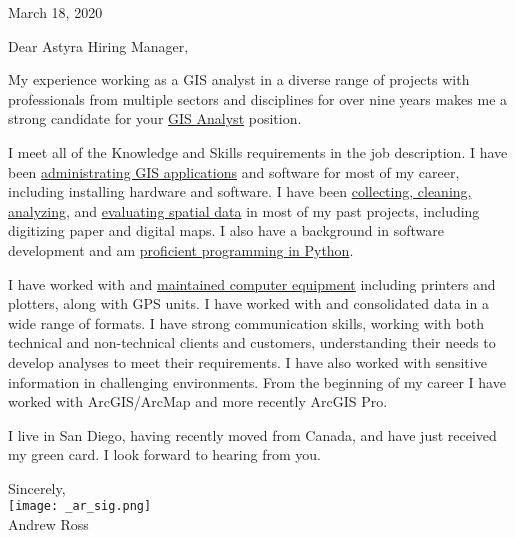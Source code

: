 \documentclass[letterpaper]{article}
\newcommand{\impt}[1]{\uline{#1}}
\begin{document}
\large

\null\hfill March 18, 2020
\vspace{1em}

Dear Astyra Hiring Manager,

My experience working as a GIS analyst in a diverse range of projects with
professionals from multiple sectors and disciplines for over nine years makes me
a strong candidate for your \impt{GIS Analyst} position.


I meet all of the Knowledge and Skills requirements in the job description.  I
have been \impt{administrating GIS applications} and software for most of my
career, including installing hardware and software.  I have been
\impt{collecting, cleaning, analyzing}, and \impt{evaluating spatial data} in
most of my past projects, including digitizing paper and digital maps.  I also
have a background in software development and am \impt{proficient programming in
Python}.

I have worked with and \impt{maintained computer equipment} including printers and
plotters, along with GPS units.  I have worked with and consolidated data in a
wide range of formats.  I have strong communication skills, working with both
technical and non-technical clients and customers, understanding their needs to
develop analyses to meet their requirements.  I have also worked with sensitive
information in challenging environments.  From the beginning of my career I have
worked with ArcGIS/ArcMap and more recently ArcGIS Pro.


I live in San Diego, having recently moved from Canada, and have just received
my green card. I look forward to hearing from you.  


Sincerely,\\
\hspace{1em} \texttt{[image: \_ar\_sig.png]} \\
Andrew Ross
\end{document}
